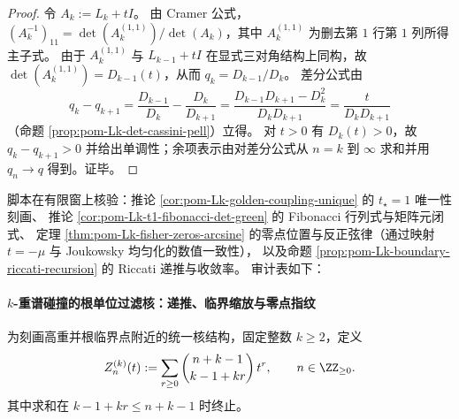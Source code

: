 \begin{proof}
令 \(A_k:=L_k+tI\)。
由 Cramer 公式，
\(
(A_k^{-1})_{11}=\det(A_k^{(1,1)})/\det(A_k)
\)，其中 \(A_k^{(1,1)}\) 为删去第 \(1\) 行第 \(1\) 列所得主子式。
由于 \(A_k^{(1,1)}\) 与 \(L_{k-1}+tI\) 在显式三对角结构上同构，故 \(\det(A_k^{(1,1)})=D_{k-1}(t)\)，从而 \(q_k=D_{k-1}/D_k\)。
差分公式由
\[
q_k-q_{k+1}
=\frac{D_{k-1}}{D_k}-\frac{D_k}{D_{k+1}}
=\frac{D_{k-1}D_{k+1}-D_k^2}{D_kD_{k+1}}
=\frac{t}{D_kD_{k+1}}
\]
（命题 \ref{prop:pom-Lk-det-cassini-pell}）立得。
对 \(t>0\) 有 \(D_k(t)>0\)，故 \(q_k-q_{k+1}>0\) 并给出单调性；余项表示由对差分公式从 \(n=k\) 到 \(\infty\) 求和并用 \(q_n\to q\) 得到。证毕。
\end{proof}

\begin{remark}\label{rem:pom-fence-green-kernel-golden-coupling-audit}
脚本在有限窗上核验：推论 \ref{cor:pom-Lk-golden-coupling-unique} 的 \(t_\star=1\) 唯一性刻画、
推论 \ref{cor:pom-Lk-t1-fibonacci-det-green} 的 Fibonacci 行列式与矩阵元闭式、
定理 \ref{thm:pom-Lk-fisher-zeros-arcsine} 的零点位置与反正弦律（通过映射 \(t=-\mu\) 与 Joukowsky 均匀化的数值一致性），
以及命题 \ref{prop:pom-Lk-boundary-riccati-recursion} 的 Riccati 递推与收敛率。
审计表如下：

\end{remark}

\paragraph{\texorpdfstring{$k$}{k}-重谱碰撞的根单位过滤核：递推、临界缩放与零点指纹}
为刻画高重并根临界点附近的统一核结构，固定整数 \(k\ge 2\)，定义
\[
Z_n^{(k)}(t):=\sum_{r\ge 0}\binom{n+k-1}{k-1+kr}\,t^r,\qquad n\in\ZZ_{\ge 0}.
\]
其中求和在 \(k-1+kr\le n+k-1\) 时终止。

